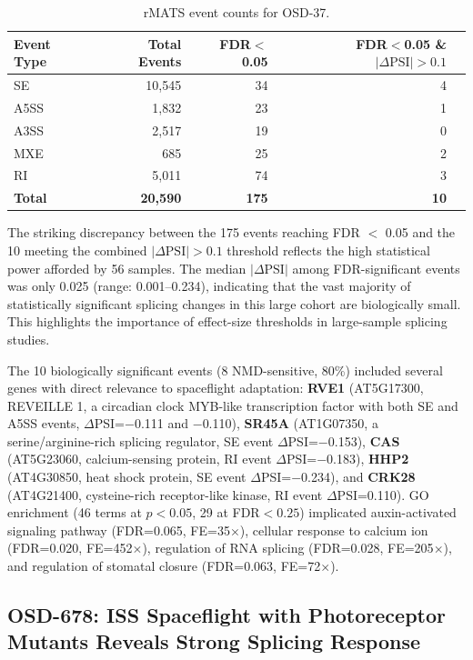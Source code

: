 \documentclass[12pt,a4paper]{article}
\begin{document}
\begin{table}[h]
\centering
\caption{rMATS event counts for OSD-37.}
\label{tab:osd37_events}
\begin{tabular}{lrrrr}
\toprule
Event Type & Total Events & FDR$<$0.05 & FDR$<$0.05 \& $|\Delta\text{PSI}|>0.1$ \\
\midrule
SE & 10,545 & 34 & 4 \\
A5SS & 1,832 & 23 & 1 \\
A3SS & 2,517 & 19 & 0 \\
MXE & 685 & 25 & 2 \\
RI & 5,011 & 74 & 3 \\
\textbf{Total} & \textbf{20,590} & \textbf{175} & \textbf{10} \\
\bottomrule
\end{tabular}
\end{table}

The striking discrepancy between the 175 events reaching FDR $<$ 0.05 and the 10 meeting the combined $|\Delta\text{PSI}| > 0.1$ threshold reflects the high statistical power afforded by 56 samples. The median $|\Delta\text{PSI}|$ among FDR-significant events was only 0.025 (range: 0.001--0.234), indicating that the vast majority of statistically significant splicing changes in this large cohort are biologically small. This highlights the importance of effect-size thresholds in large-sample splicing studies.

The 10 biologically significant events (8 NMD-sensitive, 80\%) included several genes with direct relevance to spaceflight adaptation: \textbf{RVE1} (AT5G17300, REVEILLE 1, a circadian clock MYB-like transcription factor with both SE and A5SS events, $\Delta$PSI=$-$0.111 and $-$0.110), \textbf{SR45A} (AT1G07350, a serine/arginine-rich splicing regulator, SE event $\Delta$PSI=$-$0.153), \textbf{CAS} (AT5G23060, calcium-sensing protein, RI event $\Delta$PSI=$-$0.183), \textbf{HHP2} (AT4G30850, heat shock protein, SE event $\Delta$PSI=$-$0.234), and \textbf{CRK28} (AT4G21400, cysteine-rich receptor-like kinase, RI event $\Delta$PSI=0.110). GO enrichment (46 terms at $p<0.05$, 29 at FDR$<0.25$) implicated auxin-activated signaling pathway (FDR=0.065, FE=35$\times$), cellular response to calcium ion (FDR=0.020, FE=452$\times$), regulation of RNA splicing (FDR=0.028, FE=205$\times$), and regulation of stomatal closure (FDR=0.063, FE=72$\times$).

\subsection{OSD-678: ISS Spaceflight with Photoreceptor Mutants Reveals Strong Splicing Response}
\end{document}
